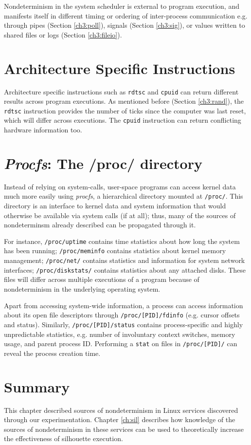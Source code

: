 Nondeterminism in the system
scheduler is external to 
program execution, and manifests itself
in different timing or ordering of
inter-process communication e.g.
through pipes (Section \ref{ch3:poll}), signals (Section \ref{ch3:sig}), or 
values written to shared files or logs (Section \ref{ch3:fileio}).

\section{Architecture Specific Instructions}
Architecture specific instructions such as \texttt{rdtsc}
and \texttt{cpuid} can return different
results across program executions. As mentioned before
(Section \ref{ch3:rand}), the \texttt{rdtsc} instruction provides the number of ticks since
the computer was last reset, which
will differ across executions. The \texttt{cpuid} instruction
can return conflicting hardware information too.

\section{{\em Procfs}: The /proc/ directory}\label{ch3:procfs}
Instead of relying on system-calls, user-space programs
can access kernel data much more easily using {\em procfs}, a hierarchical 
directory mounted at \texttt{/proc/}.
This directory is an interface
to kernel data and system information
that would otherwise be available
via system calls (if at all);
thus, many of the sources of nondeterminsm
already described can be propagated
through it.

For instance, \texttt{/proc/uptime} contains time statistics about how
long the system has been running;
\texttt{/proc/meminfo} contains statistics about kernel memory management;
\texttt{/proc/net/} contains statistics and information for system
network interfaces;
\texttt{/proc/diskstats/} contains statistics about any attached disks.
These files will differ across multiple executions
of a program because of nondeterminism in the underlying operating system. 

Apart from accessing system-wide information, a process can access 
information about its open file descriptors through
\texttt{/proc/[PID]/fdinfo} (e.g. cursor offsets and status).
Similarly, \texttt{/proc/[PID]/status} contains
process-specific and highly unpredictable statistics,
e.g. number of involuntary context switches,
memory usage, and parent process ID.
Performing a \texttt{stat} on files in \texttt{/proc/[PID]/}
can reveal the process creation time.

\section {Summary}
This chapter described sources of nondeterminism in Linux
services discovered through our experimentation.
Chapter \ref{ch:sil} describes how
knowledge of the sources of nondeterminism in these services
can be used to theoretically increase the effectiveness
of silhouette execution.
